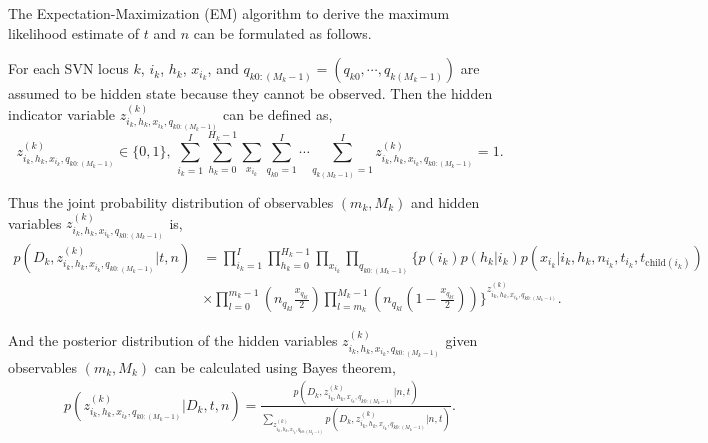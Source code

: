 \documentclass{article}
\begin{document}
The Expectation-Maximization (EM) algorithm to derive the maximum likelihood estimate of $t$ and $n$ can be formulated as follows.

For each SVN locus $k$, $i_k$, $h_k$, $x_{i_k}$, and $q_{k 0:(M_k - 1)} = ( q_{k 0}, \cdots, q_{k (M_k-1)} )$ are assumed to be hidden state because they cannot be observed.
Then the hidden indicator variable $z^{(k)}_{i_k, h_k, x_{i_k}, q_{k 0:(M_k - 1)}}$ can be defined as,
\begin{equation}
 z^{(k)}_{i_k, h_k, x_{i_k}, q_{k 0:(M_k - 1)}} \in \{0, 1\} \text{, } \sum_{i_k=1}^{I} \sum_{h_k=0}^{H_k - 1} \sum_{x_{i_k}} \sum_{q_{k0}=1}^{I} \cdots \sum_{q_{k (M_k - 1)}=1}^{I} z^{(k)}_{i_k, h_k, x_{i_k}, q_{k 0:(M_k - 1)}} = 1.
\end{equation}

Thus the joint probability distribution of observables $(m_k,M_k)$ and hidden variables $z^{(k)}_{i_k, h_k, x_{i_k}, q_{k 0:(M_k - 1)}}$ is,
\begin{align}
 p\left(D_k, z^{(k)}_{i_k, h_k, x_{i_k}, q_{k 0:(M_k - 1)}} \big| t, n\right) &= \prod_{i_k=1}^{I} \prod_{h_k=0}^{H_k - 1} \prod_{x_{i_k}} \prod_{q_{k 0:(M_k - 1)}} \Biggl\{p(i_k) p(h_k | i_k) p(x_{i_k} | i_k, h_k, n_{i_k}, t_{i_k}, t_{\mathrm{child}(i_k)})\nonumber\\
&\times \prod_{l=0}^{m_k - 1} \left( n_{q_{kl}} \frac{x_{q_{kl}}}{2} \right) \prod_{l=m_k}^{M_k - 1} \left( n_{q_{kl}} \left(1-\frac{x_{q_{kl}}}{2} \right) \right) \Biggr\}^{z^{(k)}_{i_k, h_k, x_{i_k}, q_{k 0:(M_k - 1)}}}.
\end{align}

And the posterior distribution of the hidden variables $z^{(k)}_{i_k, h_k, x_{i_k}, q_{k 0:(M_k - 1)}}$ given observables $(m_k,M_k)$ can be calculated using Bayes theorem,
\begin{align}
 p\left(z^{(k)}_{i_k, h_k, x_{i_k}, q_{k 0:(M_k - 1)}} \big| D_k, t, n\right) = \frac{p\left(D_k, z^{(k)}_{i_k, h_k, x_{i_k}, q_{k 0:(M_k - 1)}} \big| n, t\right)}{ \sum_{z^{(k)}_{i_k, h_k, x_{i_k}, q_{k 0:(M_k - 1)}}} p\left(D_k, z^{(k)}_{i_k, h_k, x_{i_k}, q_{k 0:(M_k - 1)}} \big| n, t\right) }.
\end{align}
\end{document}
